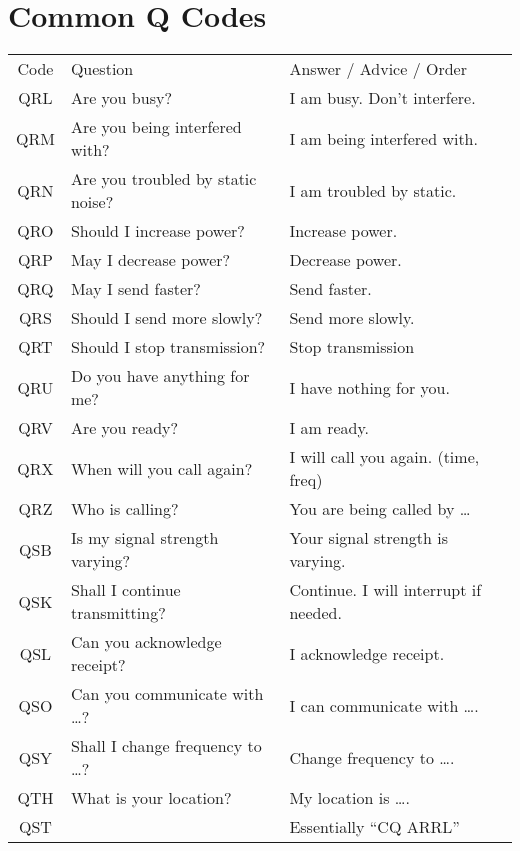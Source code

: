 \documentclass[11pt, onecolumn, table]{article}
\begin{document}
\section{Common Q Codes}
\begin{center}
  \begin{tabular}{c l l}
    Code	& Question								& Answer / Advice / Order				\\
    QRL		& Are you busy?							& I am busy. Don't interfere.			\\
    QRM		& Are you being interfered with?		& I am being interfered with.			\\
    QRN		& Are you troubled by static noise?		& I am troubled by static.				\\
    QRO		& Should I increase power?				& Increase power.						\\
    QRP		& May I decrease power?					& Decrease power.						\\
    QRQ		& May I send faster?					& Send faster.							\\
    QRS		& Should I send more slowly?			& Send more slowly.						\\
    QRT		& Should I stop transmission?			& Stop transmission						\\
    QRU		& Do you have anything for me?			& I have nothing for you.				\\
    QRV		& Are you ready?						& I am ready.							\\
    QRX		& When will you call again?				& I will call you again. (time, freq)	\\
    QRZ		& Who is calling?						& You are being called by \ldots		\\
    QSB		& Is my signal strength varying?		& Your signal strength is varying.		\\
    QSK		& Shall I continue transmitting?		& Continue. I will interrupt if needed.	\\
    QSL		& Can you acknowledge receipt?			& I acknowledge receipt.				\\
    QSO		& Can you communicate with \ldots?		& I can communicate with \ldots.		\\
    QSY		& Shall I change frequency to \ldots?	& Change frequency to \ldots.			\\
    QTH		& What is your location?				& My location is \ldots.				\\
    QST		&										& Essentially ``CQ ARRL''				\\
  \end{tabular}
\end{center}
  
\end{document}
